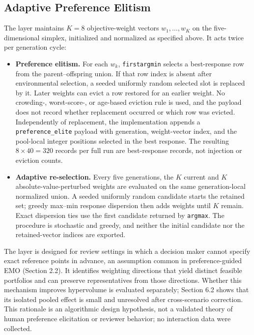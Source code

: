 \documentclass[energies,article,submit,moreauthors]{Definitions/mdpi}
\begin{document}
\subsection{Adaptive Preference Elitism}\label{adaptive-preference-elitism}

The layer maintains \(K=8\) objective-weight vectors \(w_1,\ldots,w_K\) on the five-dimensional simplex, initialized and normalized as specified above. It acts twice per generation cycle:

\begin{itemize}
\item
  \textbf{Preference elitism.} For each \(w_k\), \texttt{firstargmin} selects a best-response row from the parent--offspring union. If that row index is absent after environmental selection, a seeded uniformly random selected slot is replaced by it. Later weights can evict a row restored for an earlier weight. No crowding-, worst-score-, or age-based eviction rule is used, and the payload does not record whether replacement occurred or which row was evicted. Independently of replacement, the implementation appends a \texttt{preference\_elite} payload with generation, weight-vector index, and the pool-local integer positions selected in the best response. The resulting \(8\times40=320\) records per full run are best-response records, not injection or eviction counts.
\item
  \textbf{Adaptive re-selection.} Every five generations, the \(K\) current and \(K\) absolute-value-perturbed weights are evaluated on the same generation-local normalized union. A seeded uniformly random candidate starts the retained set; greedy max--min response dispersion then adds weights until \(K\) remain. Exact dispersion ties use the first candidate returned by \texttt{argmax}. The procedure is stochastic and greedy, and neither the initial candidate nor the retained-vector indices are exported.
\end{itemize}

The layer is designed for review settings in which a decision maker cannot specify exact reference points in advance, an assumption common in preference-guided EMO (Section 2.2). It identifies weighting directions that yield distinct feasible portfolios and can preserve representatives from those directions. Whether this mechanism improves hypervolume is evaluated separately; Section 6.2 shows that its isolated pooled effect is small and unresolved after cross-scenario correction. This rationale is an algorithmic design hypothesis, not a validated theory of human preference elicitation or reviewer behavior; no interaction data were collected.
\end{document}
